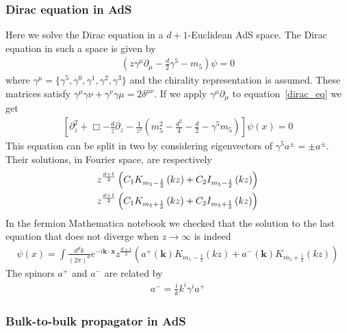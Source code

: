 \documentclass[12pt,a4paper]{article}
\begin{document}
\subsubsection{Dirac equation in AdS}
Here we solve the Dirac equation in a $d+1$-Euclidean AdS space. The Dirac equation in such a space is given by
\begin{align}
    \left( z \gamma^{\mu} \partial_\mu - \frac{d}{2} \gamma^5 - m_5 \right) \psi = 0
\label{dirac_eq}
\end{align}
where $\gamma^{\mu} = \{ \gamma^5, \gamma^{0}, \gamma^{1}, \gamma^{2}, \gamma^{3} \}$ and the chirality representation is assumed. These matrices satisfy $\gamma^{\mu} \gamma{\nu} + \gamma^{\nu} \gamma{\mu} = 2 \delta^{\mu \nu}$. If we apply $\gamma^{\mu} \partial_\mu$ to equation~\ref{dirac_eq} we get
\begin{align}
    \left[\partial^2_z + \Box - \frac{d}{z} \partial_z - \frac{1}{z^2} \left( m_5^2 - \frac{d^2}{4} - \frac{d}{2} - \gamma^{5} m_5 \right) \right] \psi \left(x \right) = 0
\label{dirac_eq_dec}
\end{align}
This equation can be split in two by considering eigenvectors of $\gamma^5 a^{\pm} = \pm a^{\pm}$. Their solutions, in Fourier space, are respectively
\begin{align}
    & z^{\frac{d+1}{2}} \left( C_1 K_{m_5 - \frac{1}{2}} \left( k z \right) + C_2 I_{m_5 - \frac{1}{2}} \left( k z \right)\right) \\
    & z^{\frac{d+1}{2}} \left( C_1 K_{m_5 + \frac{1}{2}} \left( k z \right) + C_2 I_{m_5 + \frac{1}{2}} \left( k z \right)\right) \notag
\end{align}
In the fermion Mathematica notebook we checked that the solution to the last equation that does not diverge when $z \rightarrow \infty$ is indeed
\begin{align}
    \psi\left(x\right) = \int \frac{d^d k}{{\left(2\pi\right)}^d} e^{- i\mathbf{k} \cdot \mathbf{x}} z^{\frac{d+1}{2}} \left( a^{+}\left( \mathbf{k} \right) K_{m_5-\frac{1}{2}} \left( k z \right) + a^{-}\left( \mathbf{k} \right) K_{m_5+\frac{1}{2}} \left( k z \right) \right) 
\end{align}
The spinors $a^{+}$ and $a^{-}$ are related by
\begin{align}
    a^{-} = \frac{i}{k} k^i \gamma^{i} a^{+}
\end{align}

\subsubsection{Bulk-to-bulk propagator in AdS}
\end{document}
